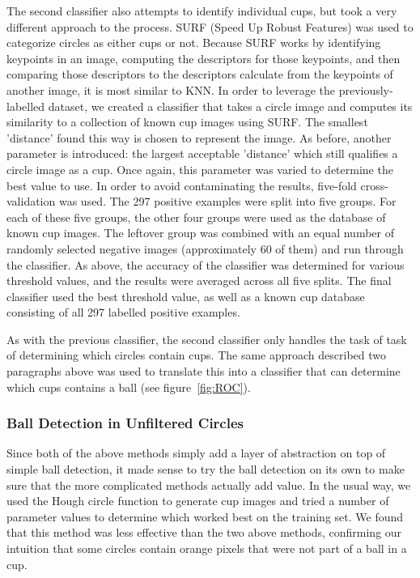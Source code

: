 \documentclass[letterpaper, 10 pt, conference]{ieeeconf}  %
\begin{document}
The second classifier also attempts to identify individual cups, but took a very different approach to the process.  SURF (Speed Up Robust Features) was used to categorize circles as either cups or not.  Because SURF works by identifying keypoints in an image, computing the descriptors for those keypoints, and then comparing those descriptors to the descriptors calculate from the keypoints of another image, it is most similar to KNN.  In order to leverage the previously-labelled dataset, we created a classifier that takes a circle image and computes its similarity to a collection of known cup images using SURF.  The smallest 'distance' found this way is chosen to represent the image.  As before, another parameter is introduced: the largest acceptable 'distance' which still qualifies a circle image as a cup.  Once again, this parameter was varied to determine the best value to use.  In order to avoid contaminating the results, five-fold cross-validation was used.  The 297 positive examples were split into five groups.  For each of these five groups, the other four groups were used as the database of known cup images.  The leftover group was combined with an equal number of randomly selected negative images (approximately 60 of them) and run through the classifier.  As above, the accuracy of the classifier was determined for various threshold values, and the results were averaged across all five splits.  The final classifier used the best threshold value, as well as a known cup database consisting of all 297 labelled positive examples.

As with the previous classifier, the second classifier only handles the task of task of determining which circles contain cups.  The same approach described two paragraphs above was used to translate this into a classifier that can determine which cups contains a ball (see figure~\ref{fig:ROC}).

\subsubsection{Ball Detection in Unfiltered Circles}

Since both of the above methods simply add a layer of abstraction on top of simple ball detection, it made sense to try the ball detection on its own to make sure that the more complicated methods actually add value.  In the usual way, we used the Hough circle function to generate cup images and tried a number of parameter values to determine which worked best on the training set.  We found that this method was less effective than the two above methods, confirming our intuition that some circles contain orange pixels that were not part of a ball in a cup.
\end{document}
